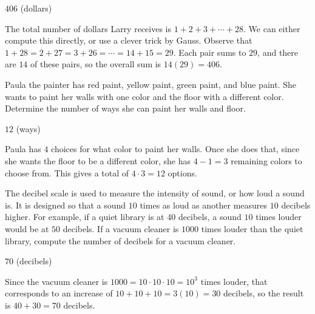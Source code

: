 \documentclass[11pt]{article}
\begin{document}
\begin{answer}
$\boxed{406}$ (dollars)
\end{answer}

\begin{solution}
The total number of dollars Larry receives is $1 + 2 + 3 + \cdots + 28$. We can either compute
this directly, or use a clever trick by Gauss. Observe that $1 + 28 = 2 + 27 = 3 + 26 = \cdots = 14 + 15 = 29$.
Each pair sums to $29$, and there are $14$ of these pairs, so the overall sum is $14(29) = \boxed{406}$.
\end{solution}


\begin{problem}
Paula the painter has red paint, yellow paint, green paint, and blue paint.
She wants to paint her walls with one color and the floor with a different color.
Determine the number of ways she can paint her walls and floor.
\end{problem}

\begin{answer}
$\boxed{12}$ (ways)
\end{answer}

\begin{solution}
Paula has $4$ choices for what color to paint her walls. Once she does that,
since she wants the floor to be a different color, she has $4-1 = 3$ remaining colors
to choose from. This gives a total of $4 \cdot 3 = \boxed{12}$ options.
\end{solution}


\begin{problem}
The decibel scale is used to measure the intensity of sound, or how loud a sound is.
It is designed so that a sound $10$ times as loud as another measures $10$ decibels higher.
For example, if a quiet library is at $40$ decibels, a sound $10$ times louder would be 
at $50$ decibels. If a vacuum cleaner is $1000$ times louder than the quiet library, 
compute the number of decibels for a vacuum cleaner.
\end{problem}

\begin{answer}
$\boxed{70}$ (decibels)
\end{answer}

\begin{solution}
Since the vacuum cleaner is $1000 = 10 \cdot 10 \cdot 10 = 10^3$ times louder,
that corresponds to an increase of $10 + 10 + 10 = 3(10) = 30$ decibels, so
the result is $40 + 30 = \boxed{70}$ decibels.
\end{solution}
\end{document}
